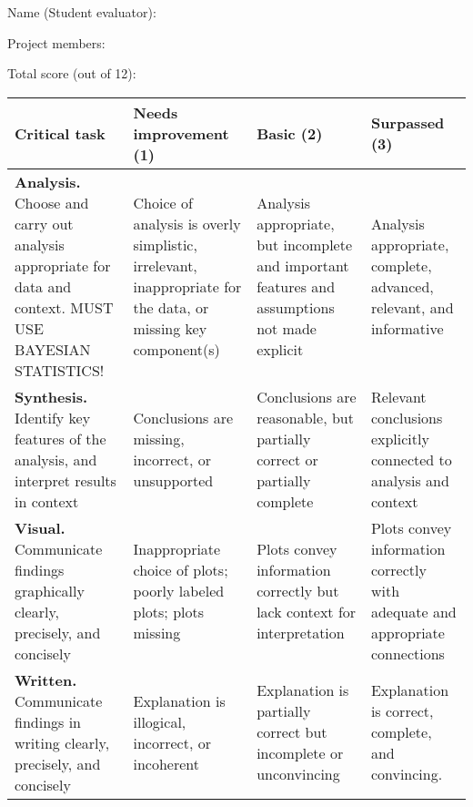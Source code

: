 \documentclass[11pt,onecolumn]{article}
\begin{document}
\vskip1in

Name (Student evaluator): 

Project members: 

Total score (out of 12): 

\begin{table}[htb]
  \centering
  \begin{tabular}{|p{4.5cm}|p{4.2cm}|p{3.75cm}|p{3.5cm}|}
    \hline
    \bf Critical task & \bf Needs improvement (1) & \bf Basic (2) & \bf Surpassed (3) \\
    \hline
    \hline
    \textbf{Analysis.} Choose and carry out analysis appropriate for data and context. MUST USE BAYESIAN STATISTICS! & Choice of analysis is overly simplistic, irrelevant, inappropriate for the data, or missing key component(s)& Analysis appropriate, but incomplete and important features and assumptions not made explicit & Analysis appropriate, complete, advanced, relevant, and informative\\
    \hline
    \textbf{Synthesis.} Identify key features of the analysis, and interpret results in context & Conclusions are missing, incorrect, or unsupported & Conclusions are reasonable, but partially correct or partially complete & Relevant conclusions explicitly connected to analysis and context\\
    \hline
    \textbf{Visual.} Communicate findings graphically clearly, precisely, and concisely & Inappropriate choice of plots; poorly labeled plots; plots missing & Plots convey information correctly but lack context for interpretation & Plots convey information correctly with adequate and appropriate connections\\
    \hline
    \textbf{Written.} Communicate findings in writing clearly, precisely, and concisely & Explanation is illogical, incorrect, or incoherent & Explanation is partially correct but incomplete or unconvincing & Explanation is correct, complete, and convincing.\\
    \hline
  \end{tabular}
\end{table}
\end{document}
